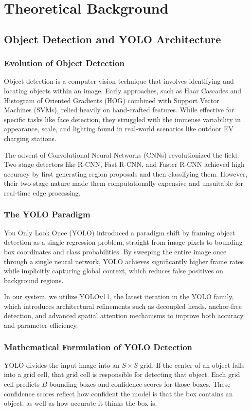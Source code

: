 \documentclass[11pt]{report}
\begin{document}
\chapter{Theoretical Background}
\section{Object Detection and YOLO Architecture}

\subsection{Evolution of Object Detection}
Object detection is a computer vision technique that involves identifying and locating objects within an image. Early approaches, such as Haar Cascades and Histogram of Oriented Gradients (HOG) combined with Support Vector Machines (SVMs), relied heavily on hand-crafted features. While effective for specific tasks like face detection, they struggled with the immense variability in appearance, scale, and lighting found in real-world scenarios like outdoor EV charging stations.

The advent of Convolutional Neural Networks (CNNs) revolutionized the field. Two stage detectors like R-CNN, Fast R-CNN, and Faster R-CNN achieved high accuracy by first generating region proposals and then classifying them. However, their two-stage nature made them computationally expensive and unsuitable for real-time edge processing.

\subsection{The YOLO Paradigm}
You Only Look Once (YOLO) introduced a paradigm shift by framing object detection as a single regression problem, straight from image pixels to bounding box coordinates and class probabilities. By sweeping the entire image once through a single neural network, YOLO achieves significantly higher frame rates while implicitly capturing global context, which reduces false positives on background regions.

In our system, we utilize YOLOv11, the latest iteration in the YOLO family, which introduces architectural refinements such as decoupled heads, anchor-free detection, and advanced spatial attention mechanisms to improve both accuracy and parameter efficiency.

\subsection{Mathematical Formulation of YOLO Detection}
YOLO divides the input image into an $S \times S$ grid. If the center of an object falls into a grid cell, that grid cell is responsible for detecting that object. Each grid cell predicts $B$ bounding boxes and confidence scores for those boxes. These confidence scores reflect how confident the model is that the box contains an object, as well as how accurate it thinks the box is. 
\end{document}
